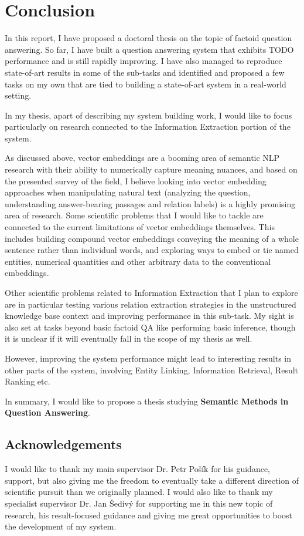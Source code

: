 \chapter{Conclusion}
\label{ch:concl}

In this report, I have proposed a doctoral thesis on the topic
of factoid question answering.
So far, I have built a question answering system that exhibits
TODO performance and is still rapidly improving.  I have also
managed to reproduce state-of-art results in some of the sub-tasks
and identified and proposed a few tasks on my own that are tied
to building a state-of-art system in a real-world setting.

In my thesis, apart of describing my system building work, I would
like to focus particularly on research connected to the Information Extraction
portion of the system.

As discussed above, vector embeddings are a booming area of semantic
NLP research with their ability to numerically capture meaning nuances,
and based on the presented survey of the field, I believe looking into
vector embedding approaches when manipulating natural text
(analyzing the question, understanding answer-bearing
passages and relation labels) is a highly promising area of research.
Some scientific problems that I would like to tackle are connected
to the current limitations of vector embeddings themselves.
This includes building compound vector embeddings conveying
the meaning of a whole sentence rather than individual words,
and
exploring ways to embed or tie named entities, numerical quantities
and other arbitrary data to the conventional embeddings.

Other scientific problems related to Information Extraction that
I plan to explore are in particular testing various relation
extraction strategies in the unstructured knowledge base context
and improving performance in this sub-task.
My sight is also set at tasks beyond basic factoid QA like performing basic inference,
though it is unclear if it will eventually fall in the scope of my
thesis as well.

However, improving the system performance might lead to interesting
results in other parts of the system, involving Entity Linking,
Information Retrieval, Result Ranking etc.

In summary, I would like to propose a thesis studying
\textbf{Semantic Methods in Question Answering}.

\section{Acknowledgements}

I would like to thank my main supervisor Dr. Petr Pošík
for his guidance, support, but also giving me the freedom to
eventually take a different direction of scientific pursuit
than we originally planned.
I would also like to thank my specialist supervisor Dr. Jan Šedivý
for supporting me in this new topic of research, his result-focused
guidance and giving me great opportunities to boost the development
of my system.
